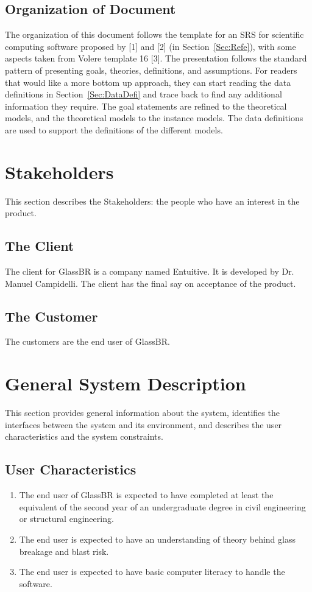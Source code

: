 \documentclass[12pt]{article}
\begin{document}
\subsection{Organization of Document}
\label{Sec:OrgaofDocu}
The organization of this document follows the template for an SRS for scientific computing software proposed by [1] and [2] (in Section~\ref{Sec:Refe}), with some aspects taken from Volere template 16 [3]. The presentation follows the standard pattern of presenting goals, theories, definitions, and assumptions. For readers that would like a more bottom up approach, they can start reading the data definitions in Section~\ref{Sec:DataDefi} and trace back to find any additional information they require.
The goal statements are refined to the theoretical models, and the theoretical models to the instance models. The data definitions are used to support the definitions of the different models.
\section{Stakeholders}
\label{Sec:Stak}
This section describes the Stakeholders: the people who have an interest in the product.
\subsection{The Client}
\label{Sec:TheClie}
The client for GlassBR is a company named Entuitive. It is developed by Dr. Manuel Campidelli. The client has the final say on acceptance of the product.
\subsection{The Customer}
\label{Sec:TheCust}
The customers are the end user of GlassBR.
\section{General System Description}
\label{Sec:GeneSystDesc}
This section provides general information about the system, identifies the interfaces between the system and its environment, and describes the user characteristics and the system constraints.
\subsection{User Characteristics}
\label{Sec:UserChar}
\begin{enumerate}
\item{The end user of GlassBR is expected to have completed at least the equivalent of the second year of an undergraduate degree in civil engineering or structural engineering.}
\item{The end user is expected to have an understanding of theory behind glass breakage and blast risk.}
\item{The end user is expected to have basic computer literacy to handle the software.}
\end{enumerate}
\end{document}
